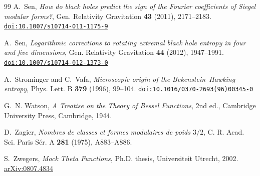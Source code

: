 \documentclass[11pt]{amsart}
\theoremstyle{definition}
\newcommand{\doi}[1]{\href{https://doi.org/#1}{\nolinkurl{doi:#1}}}
\begin{document}
\begin{thebibliography}{99}
 A.~Sen, \emph{How do black holes predict the sign of the Fourier coefficients of Siegel modular forms?}, Gen. Relativity Gravitation \textbf{43} (2011), 2171--2183. \doi{10.1007/s10714-011-1175-9}

 A.~Sen, \emph{Logarithmic corrections to rotating extremal black hole entropy in four and five dimensions}, Gen. Relativity Gravitation \textbf{44} (2012), 1947--1991. \doi{10.1007/s10714-012-1373-0}

 A.~Strominger and C.~Vafa, \emph{Microscopic origin of the Bekenstein--Hawking entropy}, Phys. Lett. B \textbf{379} (1996), 99--104. \doi{10.1016/0370-2693(96)00345-0}

 G.~N. Watson, \emph{A Treatise on the Theory of Bessel Functions}, 2nd ed., Cambridge University Press, Cambridge, 1944.

 D.~Zagier, \emph{Nombres de classes et formes modulaires de poids $3/2$}, C. R. Acad. Sci. Paris S\'er. A \textbf{281} (1975), A883--A886.

 S.~Zwegers, \emph{Mock Theta Functions}, Ph.D. thesis, Universiteit Utrecht, 2002. \href{https://arxiv.org/abs/0807.4834}{arXiv:0807.4834}

\end{thebibliography}
\end{document}
